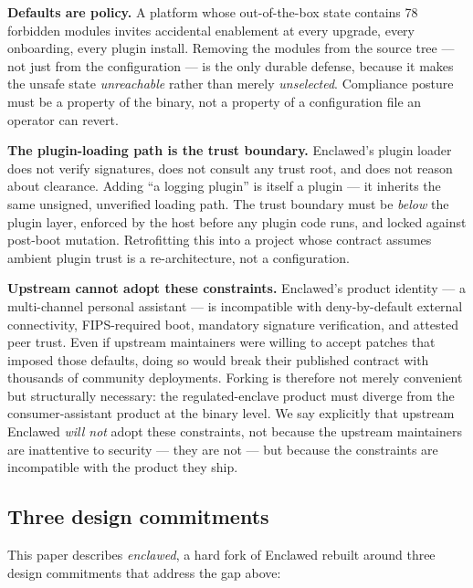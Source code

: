 \documentclass[11pt]{article}
\begin{document}
\textbf{Defaults are policy.} A platform whose out-of-the-box state
contains 78 forbidden modules invites accidental enablement at every
upgrade, every onboarding, every plugin install. Removing the modules
from the source tree --- not just from the configuration --- is the
only durable defense, because it makes the unsafe state
\emph{unreachable} rather than merely \emph{unselected}. Compliance
posture must be a property of the binary, not a property of a
configuration file an operator can revert.

\textbf{The plugin-loading path is the trust boundary.} Enclawed's
plugin loader does not verify signatures, does not consult any trust
root, and does not reason about clearance. Adding ``a logging plugin''
is itself a plugin --- it inherits the same unsigned, unverified
loading path. The trust boundary must be \emph{below} the plugin
layer, enforced by the host before any plugin code runs, and locked
against post-boot mutation. Retrofitting this into a project whose
contract assumes ambient plugin trust is a re-architecture, not a
configuration.

\textbf{Upstream cannot adopt these constraints.} Enclawed's product
identity --- a multi-channel personal assistant --- is incompatible
with deny-by-default external connectivity, FIPS-required boot,
mandatory signature verification, and attested peer trust. Even if
upstream maintainers were willing to accept patches that imposed those
defaults, doing so would break their published contract with thousands
of community deployments. Forking is therefore not merely convenient
but structurally necessary: the regulated-enclave product must diverge
from the consumer-assistant product at the binary level. We say
explicitly that upstream Enclawed \emph{will not} adopt these
constraints, not because the upstream maintainers are inattentive to
security --- they are not --- but because the constraints are
incompatible with the product they ship.

\subsection{Three design commitments}

This paper describes \emph{enclawed}, a hard fork of Enclawed rebuilt
around three design commitments that address the gap above:
\end{document}
